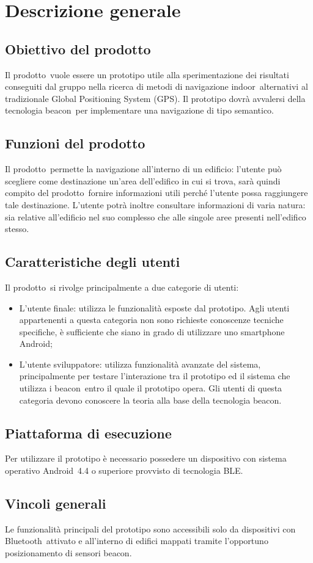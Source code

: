 \documentclass[../AnalisiDeiRequisiti.tex]{subfiles}
\begin{document}
\section{Descrizione generale}
	\subsection{Obiettivo del prodotto}
	Il prodotto\g\ vuole essere un prototipo utile alla sperimentazione dei risultati conseguiti dal gruppo nella ricerca di metodi di navigazione indoor\g\ alternativi al tradizionale Global Positioning System (GPS).
Il prototipo dovrà avvalersi della tecnologia beacon\g\ per implementare una navigazione di tipo semantico.

	\subsection{Funzioni del prodotto}
	Il prodotto\g\ permette la navigazione all'interno di un edificio: l'utente può scegliere come destinazione un'area dell'edifico in cui si trova, sarà quindi compito del prodotto\g\ 
fornire informazioni utili perché l'utente possa raggiungere tale destinazione.
L'utente potrà inoltre consultare informazioni di varia natura: sia relative all'edificio nel suo complesso che alle singole aree presenti nell'edifico stesso.
		
	\subsection{Caratteristiche degli utenti} 
	Il prodotto\g\ si rivolge principalmente a due categorie di utenti:
	\begin{itemize}
		\item L'utente finale: utilizza le funzionalità esposte dal prototipo. Agli utenti appartenenti a questa categoria non sono richieste conoscenze tecniche specifiche, è sufficiente che siano in grado di utilizzare uno smartphone Android\g;
		\item L'utente sviluppatore: utilizza funzionalità avanzate del sistema, principalmente per testare l'interazione tra il prototipo ed il sistema che utilizza i beacon\g\ entro il quale il prototipo opera. Gli utenti di questa categoria devono conoscere la teoria alla base della tecnologia beacon\g.
	\end{itemize}
	
	\subsection{Piattaforma di esecuzione}
	Per utilizzare il prototipo è necessario possedere un dispositivo con sistema operativo Android\g\ 4.4 o superiore provvisto di tecnologia BLE\g.
	
	\subsection{Vincoli generali}
	Le funzionalità principali del prototipo sono accessibili solo da dispositivi con Bluetooth\g\ attivato e all'interno di edifici mappati tramite l'opportuno posizionamento di sensori beacon\g.
\end{document}
